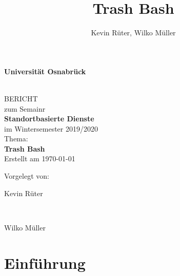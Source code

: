 \documentclass[a4paper, 11pt, DIV=11, listof=numbered, numbers=noenddot]{scrartcl}
\title{Trash Bash}
\author{Kevin Rüter, Wilko Müller}
\begin{document}
	
	
	\begin{titlepage}
		\begin{center}
			\vspace*{1.5cm}
			\begin{Large}
				\textbf{Universit\"at Osnabr\"uck}
			\end{Large}
			
			\noindent\hrulefill
			\\[3.5cm]
			BERICHT \\[1cm]
			zum Semainr \\[1cm]
			\textbf{Standortbasierte Dienste} \\[1.5cm]    %
			im Wintersemester 2019/2020 \\[1.5cm]   %
			Thema: \\[0.5cm]
			\textbf{Trash Bash} \\[2cm]        %
			Erstellt am \today
		\end{center}
		\vfill
		\begin{flushleft}
			Vorgelegt von: 
			\hfill \parbox{60mm}{Kevin Rüter} \\  %
			\hfill \parbox{60mm}{Wilko Müller}
		\end{flushleft}
	\end{titlepage}
	
	
	\newpage
	\tableofcontents 
	
	
	
	\newpage
	
	\maketitle
	
	\begin{abstract}
		\blindtext
	\end{abstract}
	
	\section{Einführung}
	\blindtext
\end{document}
